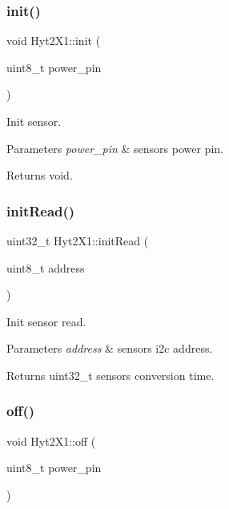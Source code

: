 \subsubsection{\texorpdfstring{init()}{init()}}
{\footnotesize\ttfamily void Hyt2\+X1\+::init (\begin{DoxyParamCaption}\item[{uint8\+\_\+t}]{power\+\_\+pin }\end{DoxyParamCaption})}



Init sensor. 


\begin{DoxyParams}{Parameters}
{\em power\+\_\+pin} & sensors power pin. \\
\hline
\end{DoxyParams}
\begin{DoxyReturn}{Returns}
void. 
\end{DoxyReturn}
\mbox{\label{namespaceHyt2X1_a47e38827f637ac58bbcec76c238de87a}} 
\subsubsection{\texorpdfstring{init\+Read()}{initRead()}}
{\footnotesize\ttfamily uint32\+\_\+t Hyt2\+X1\+::init\+Read (\begin{DoxyParamCaption}\item[{uint8\+\_\+t}]{address }\end{DoxyParamCaption})}



Init sensor read. 


\begin{DoxyParams}{Parameters}
{\em address} & sensors i2c address. \\
\hline
\end{DoxyParams}
\begin{DoxyReturn}{Returns}
uint32\+\_\+t sensors conversion time. 
\end{DoxyReturn}
\mbox{\label{namespaceHyt2X1_ae78eebe12bb6a879bc487ec001416b2e}} 
\subsubsection{\texorpdfstring{off()}{off()}}
{\footnotesize\ttfamily void Hyt2\+X1\+::off (\begin{DoxyParamCaption}\item[{uint8\+\_\+t}]{power\+\_\+pin }\end{DoxyParamCaption})}



